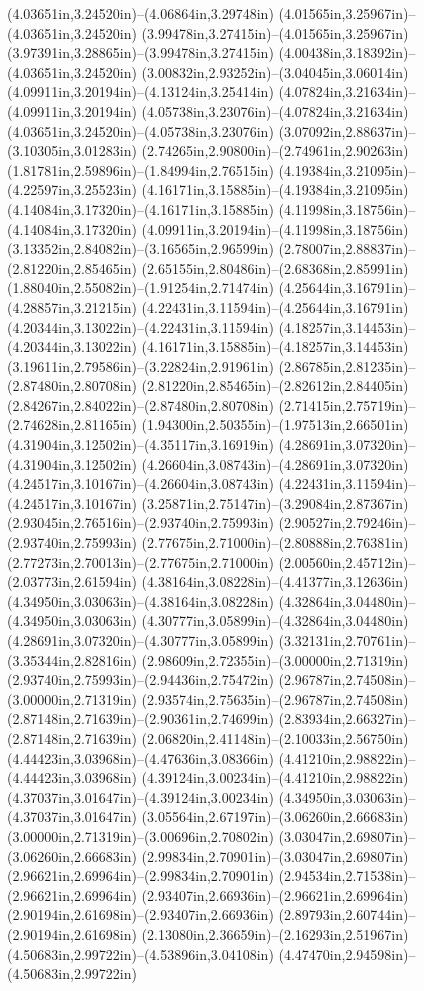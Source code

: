 (4.03651in,3.24520in)--(4.06864in,3.29748in) (4.01565in,3.25967in)--(4.03651in,3.24520in) (3.99478in,3.27415in)--(4.01565in,3.25967in) (3.97391in,3.28865in)--(3.99478in,3.27415in) (4.00438in,3.18392in)--(4.03651in,3.24520in) (3.00832in,2.93252in)--(3.04045in,3.06014in) (4.09911in,3.20194in)--(4.13124in,3.25414in) (4.07824in,3.21634in)--(4.09911in,3.20194in) (4.05738in,3.23076in)--(4.07824in,3.21634in) (4.03651in,3.24520in)--(4.05738in,3.23076in) (3.07092in,2.88637in)--(3.10305in,3.01283in) (2.74265in,2.90800in)--(2.74961in,2.90263in) (1.81781in,2.59896in)--(1.84994in,2.76515in) (4.19384in,3.21095in)--(4.22597in,3.25523in) (4.16171in,3.15885in)--(4.19384in,3.21095in) (4.14084in,3.17320in)--(4.16171in,3.15885in) (4.11998in,3.18756in)--(4.14084in,3.17320in) (4.09911in,3.20194in)--(4.11998in,3.18756in) (3.13352in,2.84082in)--(3.16565in,2.96599in) (2.78007in,2.88837in)--(2.81220in,2.85465in) (2.65155in,2.80486in)--(2.68368in,2.85991in) (1.88040in,2.55082in)--(1.91254in,2.71474in) (4.25644in,3.16791in)--(4.28857in,3.21215in) (4.22431in,3.11594in)--(4.25644in,3.16791in) (4.20344in,3.13022in)--(4.22431in,3.11594in) (4.18257in,3.14453in)--(4.20344in,3.13022in) (4.16171in,3.15885in)--(4.18257in,3.14453in) (3.19611in,2.79586in)--(3.22824in,2.91961in) (2.86785in,2.81235in)--(2.87480in,2.80708in) (2.81220in,2.85465in)--(2.82612in,2.84405in) (2.84267in,2.84022in)--(2.87480in,2.80708in) (2.71415in,2.75719in)--(2.74628in,2.81165in) (1.94300in,2.50355in)--(1.97513in,2.66501in) (4.31904in,3.12502in)--(4.35117in,3.16919in) (4.28691in,3.07320in)--(4.31904in,3.12502in) (4.26604in,3.08743in)--(4.28691in,3.07320in) (4.24517in,3.10167in)--(4.26604in,3.08743in) (4.22431in,3.11594in)--(4.24517in,3.10167in) (3.25871in,2.75147in)--(3.29084in,2.87367in) (2.93045in,2.76516in)--(2.93740in,2.75993in) (2.90527in,2.79246in)--(2.93740in,2.75993in) (2.77675in,2.71000in)--(2.80888in,2.76381in) (2.77273in,2.70013in)--(2.77675in,2.71000in) (2.00560in,2.45712in)--(2.03773in,2.61594in) (4.38164in,3.08228in)--(4.41377in,3.12636in) (4.34950in,3.03063in)--(4.38164in,3.08228in) (4.32864in,3.04480in)--(4.34950in,3.03063in) (4.30777in,3.05899in)--(4.32864in,3.04480in) (4.28691in,3.07320in)--(4.30777in,3.05899in) (3.32131in,2.70761in)--(3.35344in,2.82816in) (2.98609in,2.72355in)--(3.00000in,2.71319in) (2.93740in,2.75993in)--(2.94436in,2.75472in) (2.96787in,2.74508in)--(3.00000in,2.71319in) (2.93574in,2.75635in)--(2.96787in,2.74508in) (2.87148in,2.71639in)--(2.90361in,2.74699in) (2.83934in,2.66327in)--(2.87148in,2.71639in) (2.06820in,2.41148in)--(2.10033in,2.56750in) (4.44423in,3.03968in)--(4.47636in,3.08366in) (4.41210in,2.98822in)--(4.44423in,3.03968in) (4.39124in,3.00234in)--(4.41210in,2.98822in) (4.37037in,3.01647in)--(4.39124in,3.00234in) (4.34950in,3.03063in)--(4.37037in,3.01647in) (3.05564in,2.67197in)--(3.06260in,2.66683in) (3.00000in,2.71319in)--(3.00696in,2.70802in) (3.03047in,2.69807in)--(3.06260in,2.66683in) (2.99834in,2.70901in)--(3.03047in,2.69807in) (2.96621in,2.69964in)--(2.99834in,2.70901in) (2.94534in,2.71538in)--(2.96621in,2.69964in) (2.93407in,2.66936in)--(2.96621in,2.69964in) (2.90194in,2.61698in)--(2.93407in,2.66936in) (2.89793in,2.60744in)--(2.90194in,2.61698in) (2.13080in,2.36659in)--(2.16293in,2.51967in) (4.50683in,2.99722in)--(4.53896in,3.04108in) (4.47470in,2.94598in)--(4.50683in,2.99722in) 